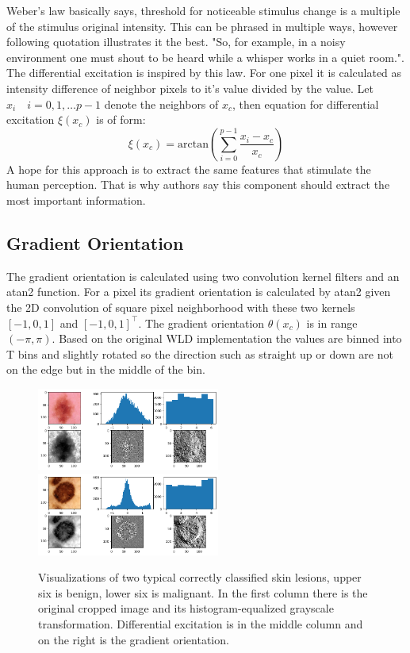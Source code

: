 \documentclass[a4paper,10pt,twocolumn]{article}
\begin{document}
Weber's law basically says, threshold for noticeable stimulus change is a multiple of the stimulus original intensity.
This can be phrased in multiple ways, however following quotation illustrates it the best.
"So, for example, in a noisy environment one must shout to be heard while a whisper works in a quiet room."\cite{chen2010wld}.
The differential excitation is inspired by this law.
For one pixel it is calculated as intensity difference of neighbor pixels to it's value divided by the value.
Let $x_i \quad i = 0, 1, \dots p-1$ denote the neighbors of $x_c$, then equation for differential excitation $\xi(x_c)$ is of form:
$$\xi(x_c) = \textrm{arctan} \left ( \sum_{i=0}^{p-1}{\frac{x_i-x_c}{x_c}} \right )$$
A hope for this approach is to extract the same features that stimulate the human perception.
That is why authors \cite{chen2010wld} say this component should extract the most important information.

\subsection{Gradient Orientation}

The gradient orientation is calculated using two convolution kernel filters and an atan2 function.
For a pixel its gradient orientation is calculated by atan2 given the 2D convolution of square pixel neighborhood with these two kernels $[-1,0,1]$ and $[-1,0,1]^{\top}$.
The gradient orientation $\theta(x_c)$ is in range $(-\pi, \pi)$.
Based on the original WLD implementation the values are binned into T bins and slightly rotated so the direction such as straight up or down are not on the edge but in the middle of the bin.

\begin{figure}[H]
       \begin{center}
              \includegraphics[width=6cm]{benign_overview}
              \includegraphics[width=6cm]{malignant_overview}
       \end{center}
       \caption{Visualizations of two typical correctly classified skin lesions, upper six is benign, lower six is malignant. In the first column there is the original cropped image and its histogram-equalized grayscale transformation. Differential excitation is in the middle column and on the right is the gradient orientation.}
       \label{fig1}
\end{figure}
\end{document}
